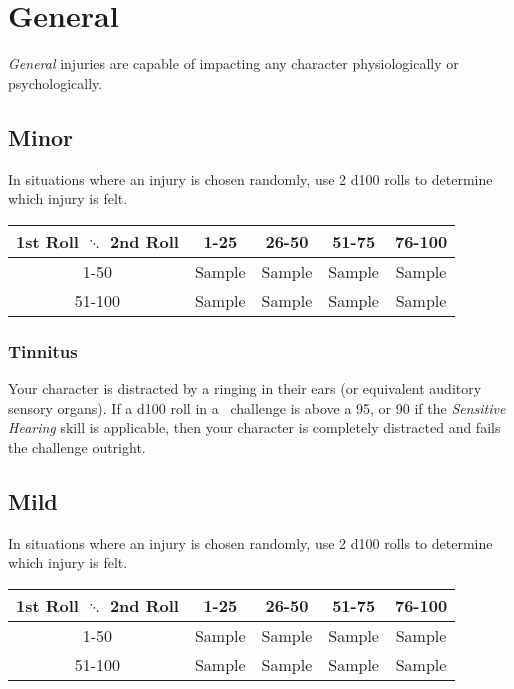 \section{General}\label{sec:gen_injuries}
\emph{General} injuries are capable of impacting any character physiologically or psychologically.
\subsection{Minor}
In situations where an injury is chosen randomly, use 2 d100 rolls to determine which injury is felt.
\begin{center}
\begin{tabular}{c | c | c | c | c}
1st Roll $\ddots$ 2nd Roll & 1-25 & 26-50 & 51-75 & 76-100 \\
\hline
1-50 & Sample & Sample & Sample & Sample\\
\hline
51-100 & Sample & Sample & Sample & Sample\\
\end{tabular}
\end{center}
\begin{multicols}{2}
\subsubsection*{Tinnitus}
Your character is distracted by a ringing in their ears (or equivalent auditory sensory organs). If a d100 roll in a \KNOWful\ challenge is above a 95, or 90 if the \emph{Sensitive Hearing} skill is applicable, then your character is completely distracted and fails the challenge outright.

\end{multicols}
\subsection{Mild}
In situations where an injury is chosen randomly, use 2 d100 rolls to determine which injury is felt.
\begin{center}
\begin{tabular}{c | c | c | c | c}
1st Roll $\ddots$ 2nd Roll & 1-25 & 26-50 & 51-75 & 76-100 \\
\hline
1-50 & Sample & Sample & Sample & Sample\\
\hline
51-100 & Sample & Sample & Sample & Sample\\
\end{tabular}
\end{center}

